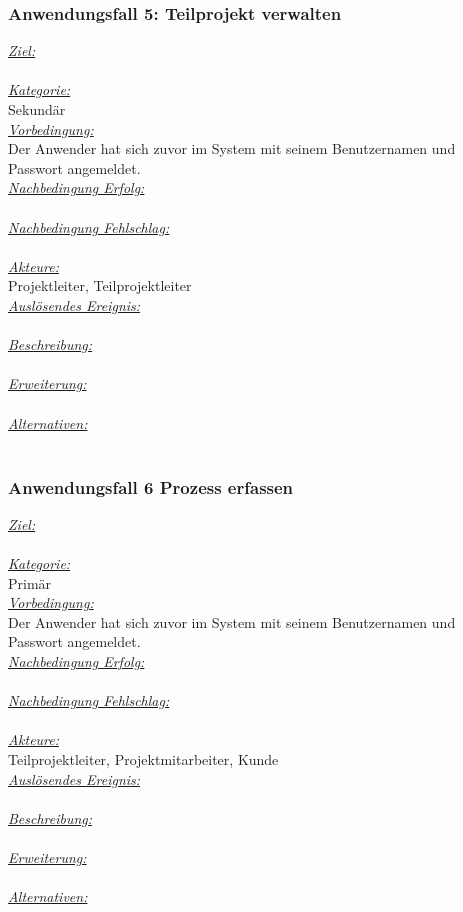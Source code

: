 \subsubsection{Anwendungsfall 5: Teilprojekt verwalten}
\underline{\emph{Ziel:}}\\
\\
\underline{\emph{Kategorie:}} \\
Sekundär\\
\underline{\emph{Vorbedingung:}} \\
Der Anwender hat sich zuvor im System mit seinem Benutzernamen und Passwort angemeldet.\\
\underline{\emph{Nachbedingung Erfolg:}} \\
\\
\underline{\emph{Nachbedingung Fehlschlag:}} \\
\\
\underline{\emph{Akteure:}} \\
Projektleiter, Teilprojektleiter\\
\underline{\emph{Auslösendes Ereignis:}} \\
\\
\underline{\emph{Beschreibung:}} \\
\\
\underline{\emph{Erweiterung:}} \\
\\
\underline{\emph{Alternativen:}} \\
\\

\subsubsection{Anwendungsfall 6 Prozess erfassen}
\underline{\emph{Ziel:}}\\
\\
\underline{\emph{Kategorie:}} \\
Primär\\
\underline{\emph{Vorbedingung:}} \\
Der Anwender hat sich zuvor im System mit seinem Benutzernamen und Passwort angemeldet.\\
\underline{\emph{Nachbedingung Erfolg:}} \\
\\
\underline{\emph{Nachbedingung Fehlschlag:}} \\
\\
\underline{\emph{Akteure:}} \\
Teilprojektleiter, Projektmitarbeiter, Kunde\\
\underline{\emph{Auslösendes Ereignis:}} \\
\\
\underline{\emph{Beschreibung:}} \\
\\
\underline{\emph{Erweiterung:}} \\
\\
\underline{\emph{Alternativen:}} \\
\\



